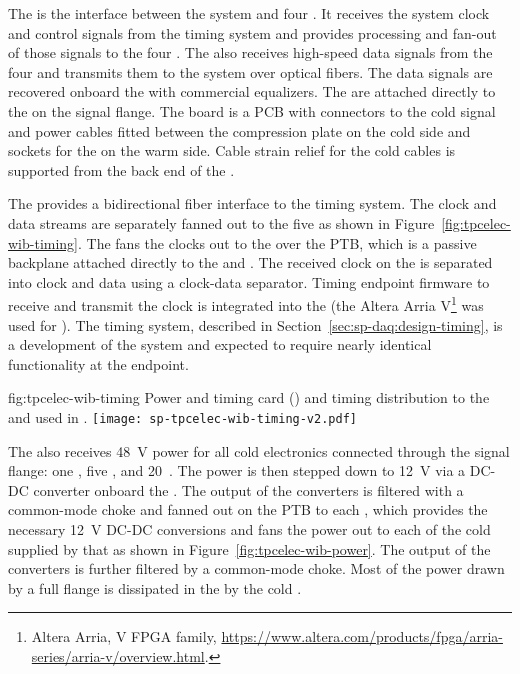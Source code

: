 The  is the interface between the  system and four
. It receives the system clock and control signals from the
timing system and provides processing and fan-out of those signals to the four
. The  also receives high-speed data signals from the four 
 and transmits them to the  system over optical
fibers. The data signals are recovered onboard the  with commercial equalizers.
The  are attached directly to the 
 \fdth on the signal flange. The \fdth
board is a PCB with connectors to the cold signal and  power cables fitted
between the compression plate on the cold side and sockets for
the  on the warm side. Cable strain relief for the cold cables is 
supported from the back end of the \fdth.

The   provides a bidirectional fiber interface to the
timing system. The clock and data
streams are separately fanned out to the five  as shown in
Figure~\ref{fig:tpcelec-wib-timing}. The  fans the clocks out to the  over the
PTB, which is a passive backplane attached directly to the  and
.  The received clock on the  is separated into clock and
data using a clock-data separator. Timing endpoint firmware to receive and transmit
the clock is integrated into the   (the Altera Arria V\footnote{Altera Arria\texttrademark{}, V FPGA family, \url{https://www.altera.com/products/fpga/arria-series/arria-v/overview.html}.} was used for ).
The  timing system, described in Section~\ref{sec:sp-daq:design-timing}, is a development of the  system and expected to require nearly identical functionality at the  endpoint.

\begin{dunefigure}
{fig:tpcelec-wib-timing}
{Power and timing card () and timing distribution to the  and  used in .}
\texttt{[image: sp-tpcelec-wib-timing-v2.pdf]}
\end{dunefigure}

The  also receives \SI{48}{V}  power for all cold
electronics connected through the  signal flange: one , five , and \num{20}~. The  power is then stepped down
to \SI{12}{V} via a DC-DC converter onboard the . The output of the  converters is filtered with a common-mode choke and fanned out
on the PTB to each , which provides the necessary \SI{12}{V} DC-DC conversions and fans
the  power out to each of the cold  supplied by that  
as shown in Figure~\ref{fig:tpcelec-wib-power}. The output of the  converters is further filtered by a common-mode choke. Most of the power drawn by a full flange is dissipated in the  by the cold .

